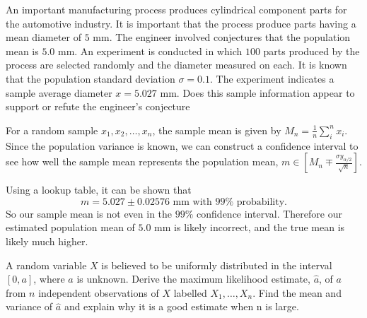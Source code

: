 \documentclass{article}
\begin{document}
    \makemytitle

    \nextproblem
    \nextproblem

    \begin{problem}
        An important manufacturing process produces cylindrical component parts for the automotive industry. It is important that the process produce parts having a mean diameter of $5$ mm. The engineer involved conjectures that the population mean is $5.0$ mm. An experiment is conducted in which $100$ parts produced by the process are selected randomly and the diameter measured on each. It is known that the population standard deviation $\sigma = 0.1$. The experiment indicates a sample average diameter $x = 5.027$ mm. Does this sample information appear to support or refute the engineer’s conjecture
    \end{problem}

    \begin{solution}
        For a random sample $x_1, x_2, \ldots, x_n$, the sample mean is given by $M_n = \frac{1}{n}\sum_i^n x_i$. Since the population variance is known, we can construct a confidence interval to see how well the sample mean represents the population mean, $m \in [M_n \mp \frac{\sigma y_{\alpha/2}}{\sqrt{n}}]$.

        Using a lookup table, it can be shown that
        \begin{equation}
            m = 5.027 \pm 0.02576 \text{ mm with } 99\% \text{ probability}.
        \end{equation}
        So our sample mean is not even in the $99\%$ confidence interval. Therefore our estimated population mean of $5.0$ mm is likely incorrect, and the true mean is likely much higher.
    \end{solution}

    \nextproblem

    \begin{problem}
        A random variable $X$ is believed to be uniformly distributed in the interval $[0,a]$, where $a$ is unknown. Derive the maximum likelihood estimate, $\hat{a}$, of $a$ from $n$ independent observations of $X$ labelled $X_1, \ldots, X_n$. Find the mean and variance of $\hat{a}$ and explain why it is a good estimate when n is large.
    \end{problem}
\end{document}
